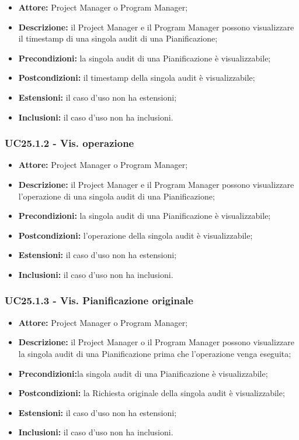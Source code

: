 \begin{itemize}[label=$\circ$]
\item \textbf{Attore:} Project Manager o Program Manager;
\item \textbf{Descrizione:} il Project Manager e il Program Manager possono visualizzare il
timestamp di una singola audit di una Pianificazione;
\item \textbf{Precondizioni:} la singola audit di una Pianificazione è visualizzabile;
\item \textbf{Postcondizioni:} il timestamp della singola audit è visualizzabile;
\item \textbf{Estensioni:} il caso d'uso non ha estensioni;
\item \textbf{Inclusioni:} il caso d'uso non ha inclusioni.
\end{itemize}

\subsubsection*{UC25.1.2 - Vis. operazione}

\begin{itemize}[label=$\circ$]
\item \textbf{Attore:} Project Manager o Program Manager;
\item \textbf{Descrizione:} il Project Manager e il Program Manager possono visualizzare l'operazione di una singola audit di una Pianificazione;
\item \textbf{Precondizioni:} la singola audit di una Pianificazione è visualizzabile;
\item \textbf{Postcondizioni:} l’operazione della singola audit è visualizzabile;
\item \textbf{Estensioni:} il caso d'uso non ha estensioni;
\item \textbf{Inclusioni:} il caso d'uso non ha inclusioni.
\end{itemize}

\subsubsection*{UC25.1.3 - Vis. Pianificazione originale}

\begin{itemize}[label=$\circ$]
\item \textbf{Attore:} Project Manager o Program Manager;
\item \textbf{Descrizione:} il Project Manager o il Program Manager possono visualizzare la
singola audit di una Pianificazione prima che l’operazione venga eseguita;
\item \textbf{Precondizioni:}la singola audit di una Pianificazione è visualizzabile;
\item \textbf{Postcondizioni:} la Richiesta originale della singola audit è visualizzabile;
\item \textbf{Estensioni:} il caso d'uso non ha estensioni;
\item \textbf{Inclusioni:} il caso d'uso non ha inclusioni.
\end{itemize}


